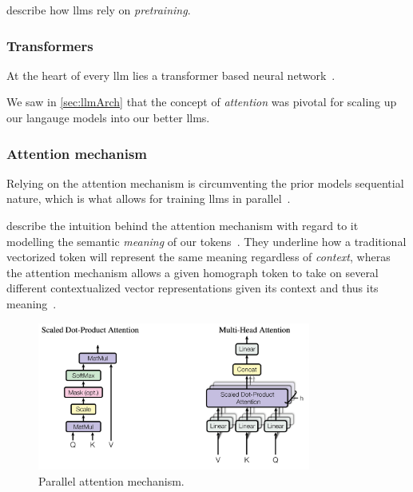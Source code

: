 \citeauthor{jm} describe how \acrshort{llms} rely on \textit{pretraining}.

\subsubsection*{Transformers}

At the heart of every \acrshort{llm} lies a transformer based neural
network~\cite[4]{llmSurvey}.

We saw in \cref{sec:llmArch} that the \citeauthor{attentionIsAllYouNeed} concept
of \textit{attention} was pivotal for scaling up our langauge models into our
better \acrlong{llms}.

\subsubsection*{Attention mechanism}

Relying on the attention mechanism is circumventing the
prior models sequential nature, which is what allows for training \acrlong{llms}
in parallel~\cite[2]{attentionIsAllYouNeed}.

\citeauthor{jm} describe the intuition behind the attention mechanism with
regard to it modelling the semantic \textit{meaning} of our
tokens~\cite[185]{jm}. They underline how a traditional vectorized token will
represent the same meaning regardless of \textit{context}, wheras the attention
mechanism allows a given homograph token to take on several different
contextualized vector representations given its context and thus its
meaning~\cite[185-186]{jm}.



\begin{figure}[h]
    \centering
    \includegraphics[width=0.8\textwidth]{media/attentionArches.png}
    \caption[Parallel attention mechanism]{Parallel attention mechanism.\footnotemark}\label{fig:paraAttention}
\end{figure}

